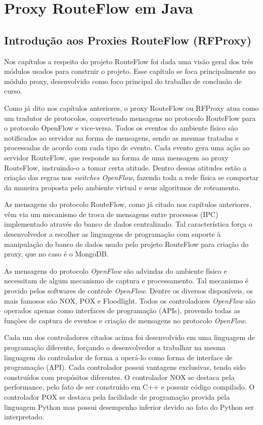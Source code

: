 \chapter{Proxy RouteFlow em Java}

\section{Introdução aos Proxies RouteFlow (RFProxy)}

Nos capítulos a respeito do projeto RouteFlow foi dada
uma visão geral dos três módulos usados para
construir o projeto. Esse capítulo se foca principalmente no 
módulo proxy, desenvolvido como foco principal do trabalho de
conclusão de curso.

Como já dito nos capítulos anteriores, o proxy RouteFlow ou
RFProxy atua como um tradutor de protocolos, convertendo
mensagens no protocolo RouteFlow para o protocolo OpenFlow
e vice-versa. Todos os eventos do ambiente físico são notificados
ao servidor na forma de mensagens, sendo as mesmas tratadas 
e processadas de acordo com cada tipo de evento. Cada evento gera uma 
ação ao servidor RouteFlow, que responde na forma de uma 
mensagem ao proxy RouteFlow, instruindo-o a tomar certa atitude.
Dentro dessas atitudes estão a criação das regras nos \textit{
switches OpenFlow}, fazendo toda a rede física se comportar
da maneira proposta pelo ambiente virtual e seus algoritmos de
roteamento.

As mensagens do protocolo RouteFlow, como já citado nos
capítulos anteriores, vêm via um mecanismo de troca de mensagens
entre processos (IPC) implementado através do banco de dados
centralizado. Tal característica força o desenvolvedor a escolher
as linguagens de programação com suporte à manipulação do
banco de dados usado pelo projeto RouteFlow para criação do proxy, que no caso
é o MongoDB.

As mensagens do protocolo \textit{OpenFlow} são advindas do ambiente
físico e necessitam de algum mecanismo de captura e processamento.
Tal mecanismo é provido pelos softwares de controle \textit{
OpenFlow}. Dentre os diversos disponíveis, os mais famosos
são NOX, POX e Floodlight. Todos os controladores
\textit{OpenFlow} são operados apenas como 
interfaces de programação (APIs), provendo todas as funções de captura
de eventos e criação de mensagens no protocolo \textit{OpenFlow}.

Cada um dos controladores citados acima foi desenvolvido em
uma linguagem de programação diferente, forçando o desenvolvedor
a trabalhar na mesma linguagem do controlador de forma a 
operá-lo como forma de interface de programação (API). 
Cada controlador possui vantagens exclusivas, tendo sido construídos
com propósitos diferentes. O controlador NOX se destaca pela
performance, pelo fato de ser construído em C++ e possuir
código compilado. O controlador POX se destaca pela
facilidade de programação provida pela linguagem Python mas
possui desempenho inferior devido ao fato do Python ser
interpretado. 

